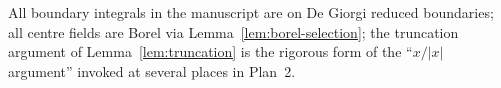 All boundary integrals in the manuscript are on De Giorgi reduced
boundaries; all centre fields are Borel via
Lemma~\ref{lem:borel-selection}; the truncation argument of
Lemma~\ref{lem:truncation} is the rigorous form of the
``$x/|x|$ argument'' invoked at several places in Plan~2.

